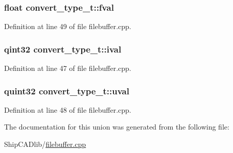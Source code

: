 \subsubsection[{\texorpdfstring{fval}{fval}}]{\setlength{\rightskip}{0pt plus 5cm}float convert\+\_\+type\+\_\+t\+::fval}\hypertarget{unionconvert__type__t_aa56281b3a5e206689c30ce623aa6dc0b}{}\label{unionconvert__type__t_aa56281b3a5e206689c30ce623aa6dc0b}


Definition at line 49 of file filebuffer.\+cpp.

\subsubsection[{\texorpdfstring{ival}{ival}}]{\setlength{\rightskip}{0pt plus 5cm}qint32 convert\+\_\+type\+\_\+t\+::ival}\hypertarget{unionconvert__type__t_a23001696f165130f03d305c2bc1442eb}{}\label{unionconvert__type__t_a23001696f165130f03d305c2bc1442eb}


Definition at line 47 of file filebuffer.\+cpp.

\subsubsection[{\texorpdfstring{uval}{uval}}]{\setlength{\rightskip}{0pt plus 5cm}quint32 convert\+\_\+type\+\_\+t\+::uval}\hypertarget{unionconvert__type__t_a589a9a481a1889a166442e985519ac7c}{}\label{unionconvert__type__t_a589a9a481a1889a166442e985519ac7c}


Definition at line 48 of file filebuffer.\+cpp.



The documentation for this union was generated from the following file\+:\begin{DoxyCompactItemize}
\item 
Ship\+C\+A\+Dlib/\hyperlink{filebuffer_8cpp}{filebuffer.\+cpp}\end{DoxyCompactItemize}
